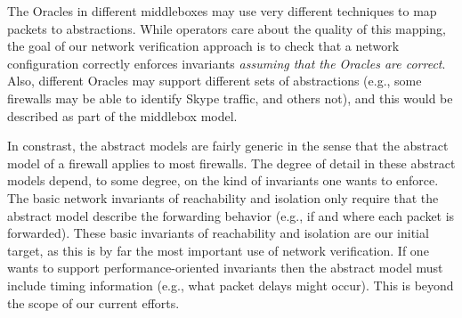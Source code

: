 The Oracles in different middleboxes may use very different techniques to map packets to abstractions. While operators care about the quality of this mapping, the goal of our network verification approach is to check that a network configuration correctly enforces invariants {\em assuming that the Oracles are correct}. Also, different Oracles may  support different sets of abstractions (e.g., some firewalls may be able to identify Skype traffic, and others not), and this would be described as part of the middlebox model.

In constrast, the abstract models are fairly generic in the sense that the abstract model of a firewall applies to most firewalls. The degree of detail in these abstract models depend, to some degree, on the kind of invariants one wants to enforce.  The basic network invariants of reachability and isolation only require that the abstract model describe the forwarding behavior (e.g., if and where each packet is forwarded). These basic invariants of reachability and isolation are our initial target, as this is by far the most important use of network verification. If one wants to support performance-oriented invariants then the abstract model must include timing information (e.g., what packet delays might occur). This is beyond the scope of our current efforts.

